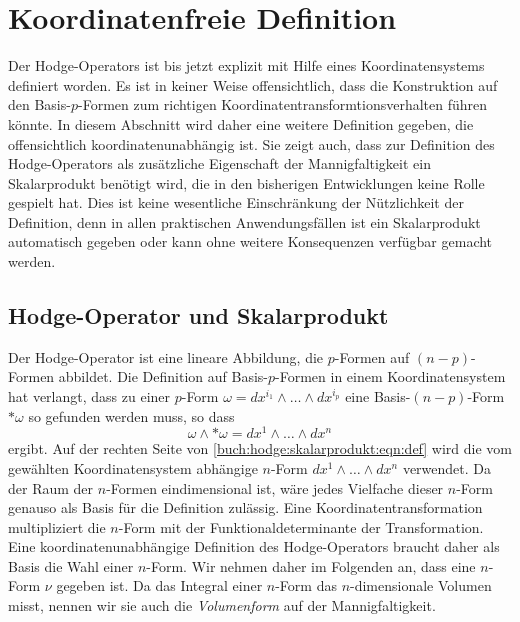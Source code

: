 %
%
%
\section{Koordinatenfreie Definition
\label{buch:hodge:section:koordinatenfrei}}
Der Hodge-Operators ist bis jetzt explizit mit Hilfe eines
Koordinatensystems definiert worden.
Es ist in keiner Weise offensichtlich, dass die Konstruktion auf
den Basis-$p$-Formen zum richtigen Koordinatentransformtionsverhalten führen
könnte.
In diesem Abschnitt wird daher eine weitere Definition gegeben,
die offensichtlich koordinatenunabhängig ist.
Sie zeigt auch, dass zur Definition des Hodge-Operators als
zusätzliche Eigenschaft der Mannigfaltigkeit ein Skalarprodukt
benötigt wird, die in den bisherigen Entwicklungen keine Rolle
gespielt hat.
Dies ist keine wesentliche Einschränkung der Nützlichkeit der
Definition, denn in allen praktischen Anwendungsfällen ist ein
Skalarprodukt automatisch gegeben oder kann ohne weitere Konsequenzen
verfügbar gemacht werden.

%

%
%
\subsection{Hodge-Operator und Skalarprodukt
\label{buch:hodge:koordinatenfrei:subsection:skalarprodukt}}
Der Hodge-Operator ist eine lineare Abbildung, die 
$p$-Formen auf $(n-p)$-Formen abbildet.
Die Definition auf Basis-$p$-Formen in einem Koordinatensystem
hat verlangt, dass zu einer $p$-Form $\omega=dx^{i_1}\wedge\dots\wedge dx^{i_p}$
eine Basis-$(n-p)$-Form $\ast\omega$ so gefunden werden muss, so dass
\begin{equation}
\omega\wedge {\ast\omega}
=
dx^1\wedge\dots\wedge dx^n
\label{buch:hodge:skalarprodukt:eqn:def}
\end{equation}
ergibt.
Auf der rechten Seite von \eqref{buch:hodge:skalarprodukt:eqn:def}
wird die vom gewählten Koordinatensystem abhängige $n$-Form
$dx^1\wedge\dots\wedge dx^n$ verwendet.
Da der Raum der $n$-Formen eindimensional ist, wäre jedes Vielfache
dieser $n$-Form genauso als Basis für die Definition zulässig.
Eine Koordinatentransformation multipliziert die $n$-Form mit der
Funktionaldeterminante der Transformation.
Eine koordinatenunabhängige Definition des Hodge-Operators braucht
daher als Basis die Wahl einer $n$-Form.
Wir nehmen daher im Folgenden an, dass eine $n$-Form $\nu$ gegeben
ist.
Da das Integral einer $n$-Form das $n$-dimensionale Volumen misst,
nennen wir sie auch die {\em Volumenform} auf der Mannigfaltigkeit.

